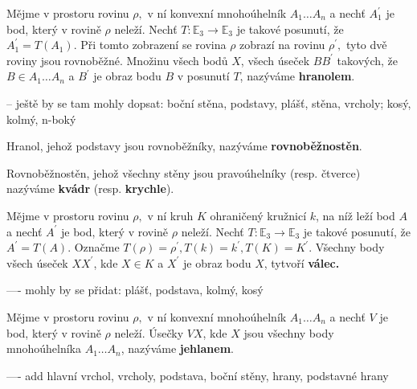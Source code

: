 \begin{definition}
    Mějme v prostoru rovinu $\rho,$ v ní konvexní mnohoúhelník $A_1\dots A_n$ a nechť
    $A_1^\prime$ je bod, který v rovině $\rho$ neleží. Nechť $T: \mathbb E_3 \to
    \mathbb E_3$ je takové posunutí, že $A_1^\prime=T(A_1).$ Při tomto zobrazení se rovina
    $\rho$ zobrazí na rovinu $\rho^\prime,$ tyto dvě roviny jsou rovnoběžné. Množinu všech
    bodů $X$, všech úseček $BB^\prime$ takových, že $B\in A_1\dots A_n$ a $B^\prime$ je
    obraz bodu $B$ v posunutí $T$, nazýváme \textbf{hranolem}.
\end{definition}

\begin{pozn}
    -- ještě by se tam mohly dopsat: boční stěna, podstavy, plášť, stěna, vrcholy; kosý,
    kolmý, n-boký
\end{pozn}

\begin{definition}
    Hranol, jehož podstavy jsou rovnoběžníky, nazýváme \textbf{rovnoběžnostěn}.
\end{definition}

\begin{definition}
    Rovnoběžnostěn, jehož všechny stěny jsou pravoúhelníky (resp. čtverce) nazýváme
    \textbf{kvádr} (resp. \textbf{krychle}).
\end{definition}

\begin{definition}
    Mějme v prostoru rovinu $\rho,$ v ní kruh $K$ ohraničený kružnicí $k$, na níž
    leží bod $A$ a nechť
    $A^\prime$ je bod, který v rovině $\rho$ neleží. Nechť $T: \mathbb E_3 \to
    \mathbb E_3$ je takové posunutí, že $A^\prime=T(A).$ Označme $T(\rho)=\rho^\prime,
    T(k)=k^\prime, T(K)=K^\prime.$ Všechny body všech úseček $XX^\prime$, kde $X\in K$
    a $X^\prime$ je obraz bodu $X$, tytvoří \textbf{válec.}
\end{definition}

\begin{pozn}
    ---- mohly by se přidat: plášť, podstava, kolmý, kosý
\end{pozn}

\begin{definition}
Mějme v prostoru rovinu $\rho,$ v ní konvexní mnohoúhelník $A_1\dots A_n$ a nechť
$V$ je bod, který v rovině $\rho$ neleží. Úsečky $VX$, kde $X$ jsou všechny body
mnohoúhelníka $A_1\dots A_n$, nazýváme \textbf{jehlanem}.
\end{definition}

\begin{pozn}
    ---- add hlavní vrchol, vrcholy, podstava, boční stěny, hrany, podstavné hrany
\end{pozn}

